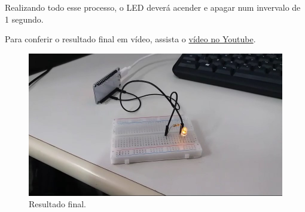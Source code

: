 \documentclass[12pt]{article}
\begin{document}
Realizando todo esse processo, o LED deverá acender e apagar num invervalo de 1 segundo.

Para conferir o resultado final em vídeo, assista o \href{https://youtu.be/n_IYHKFdlQg}{vídeo no Youtube}.

\begin{figure}[H]
    \centering
    \includegraphics[width=0.5\linewidth]{img/Vídeo do WhatsApp de 2024-10-25 à(s) 22.05.43_c4fb24fe.mp4_snapshot_00.02.438.jpg}
    \caption{Resultado final.}
    \label{fig:result}
\end{figure}
\end{document}
